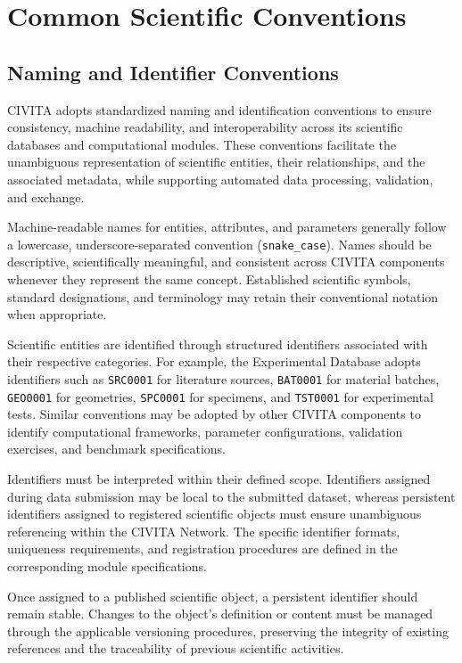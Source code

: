 \chapter{Common Scientific Conventions}

\section{Naming and Identifier Conventions}

CIVITA adopts standardized naming and identification conventions to ensure consistency, machine readability, and interoperability across its scientific databases and computational modules. These conventions facilitate the unambiguous representation of scientific entities, their relationships, and the associated metadata, while supporting automated data processing, validation, and exchange.

Machine-readable names for entities, attributes, and parameters generally follow a lowercase, underscore-separated convention (\texttt{snake\_case}). Names should be descriptive, scientifically meaningful, and consistent across CIVITA components whenever they represent the same concept. Established scientific symbols, standard designations, and terminology may retain their conventional notation when appropriate.

Scientific entities are identified through structured identifiers associated with their respective categories. For example, the Experimental Database adopts identifiers such as \texttt{SRC0001} for literature sources, \texttt{BAT0001} for material batches, \texttt{GEO0001} for geometries, \texttt{SPC0001} for specimens, and \texttt{TST0001} for experimental tests. Similar conventions may be adopted by other CIVITA components to identify computational frameworks, parameter configurations, validation exercises, and benchmark specifications.

Identifiers must be interpreted within their defined scope. Identifiers assigned during data submission may be local to the submitted dataset, whereas persistent identifiers assigned to registered scientific objects must ensure unambiguous referencing within the CIVITA Network. The specific identifier formats, uniqueness requirements, and registration procedures are defined in the corresponding module specifications.

Once assigned to a published scientific object, a persistent identifier should remain stable. Changes to the object's definition or content must be managed through the applicable versioning procedures, preserving the integrity of existing references and the traceability of previous scientific activities.


